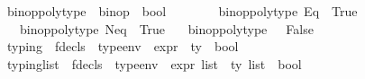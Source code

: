 \begin{isabellebody}
\isanewline
{}\isamarkupfalse%
\ binop{\isacharunderscore}{\kern0pt}poly{\isacharunderscore}{\kern0pt}type\ {\isacharcolon}{\kern0pt}{\isacharcolon}{\kern0pt}\ {\isachardoublequoteopen}binop\ {\isasymRightarrow}\ bool{\isachardoublequoteclose}\isanewline
\ \ \ \isanewline
\ \ \ \ {\isachardoublequoteopen}binop{\isacharunderscore}{\kern0pt}poly{\isacharunderscore}{\kern0pt}type\ Eq\ {\isacharequal}{\kern0pt}\ True{\isachardoublequoteclose}\isanewline
\ \ {\isacharbar}{\kern0pt}\ {\isachardoublequoteopen}binop{\isacharunderscore}{\kern0pt}poly{\isacharunderscore}{\kern0pt}type\ Neq\ {\isacharequal}{\kern0pt}\ True{\isachardoublequoteclose}\isanewline
\ \ {\isacharbar}{\kern0pt}\ {\isachardoublequoteopen}binop{\isacharunderscore}{\kern0pt}poly{\isacharunderscore}{\kern0pt}type\ {\isacharunderscore}{\kern0pt}\ {\isacharequal}{\kern0pt}\ False{\isachardoublequoteclose}\isanewline
\isanewline
{}\isamarkupfalse%
\ typing\ {\isacharcolon}{\kern0pt}{\isacharcolon}{\kern0pt}\ {\isachardoublequoteopen}fdecls\ {\isasymRightarrow}\ type{\isacharunderscore}{\kern0pt}env\ {\isasymRightarrow}\ expr\ {\isasymRightarrow}\ ty\ {\isasymRightarrow}\ bool{\isachardoublequoteclose}\ {\isacharparenleft}{\kern0pt}{\isachardoublequoteopen}{\isacharunderscore}{\kern0pt}{\isacharcomma}{\kern0pt}{\isacharunderscore}{\kern0pt}\ {\isasymturnstile}\ {\isacharparenleft}{\kern0pt}{\isacharunderscore}{\kern0pt}\ {\isacharcolon}{\kern0pt}\ {\isacharunderscore}{\kern0pt}{\isacharparenright}{\kern0pt}{\isachardoublequoteclose}\ {\isacharbrackleft}{\kern0pt}{}{}{\isacharcomma}{\kern0pt}{}{\isacharcomma}{\kern0pt}{}{\isacharcomma}{\kern0pt}{}{\isacharbrackright}{\kern0pt}\ {}{}{\isacharparenright}{\kern0pt}\isanewline
{}\ typing{\isacharunderscore}{\kern0pt}list\ {\isacharcolon}{\kern0pt}{\isacharcolon}{\kern0pt}\ {\isachardoublequoteopen}fdecls\ {\isasymRightarrow}\ type{\isacharunderscore}{\kern0pt}env\ {\isasymRightarrow}\ expr\ list\ {\isasymRightarrow}\ ty\ list\ {\isasymRightarrow}\ bool{\isachardoublequoteclose}\ {\isacharparenleft}{\kern0pt}{\isachardoublequoteopen}{\isacharunderscore}{\kern0pt}{\isacharcomma}{\kern0pt}{\isacharunderscore}{\kern0pt}\ {\isasymturnstile}\ {\isacharparenleft}{\kern0pt}{\isacharunderscore}{\kern0pt}\ {\isacharbrackleft}{\kern0pt}{\isacharcolon}{\kern0pt}{\isacharbrackright}{\kern0pt}\ {\isacharunderscore}{\kern0pt}{\isacharparenright}{\kern0pt}{\isachardoublequoteclose}\ {\isacharbrackleft}{\kern0pt}{}{}{\isacharcomma}{\kern0pt}{}{\isacharcomma}{\kern0pt}{}{\isacharcomma}{\kern0pt}{}{\isacharbrackright}{\kern0pt}\ {}{}{\isacharparenright}{\kern0pt}\isanewline

\end{isabellebody}
